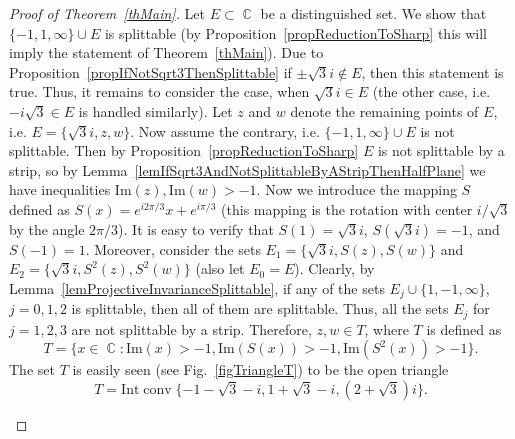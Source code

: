 \documentclass{amsart}
\numberwithin{equation}{section}
\theoremstyle{definition}
\theoremstyle{remark}
\DeclareMathOperator{\conv}{conv}
\DeclareMathOperator{\CC}{\mathbb C}
\begin{document}
	\begin{proof}[Proof of Theorem~\ref{thMain}]
		Let $E \subset \CC$ be a distinguished set. We show that $\{-1,1,\infty\} \cup E$ is splittable (by Proposition~\ref{propReductionToSharp} this will imply the statement of Theorem~\ref{thMain}). Due to Proposition~\ref{propIfNotSqrt3ThenSplittable} if $\pm \sqrt{3}i \notin E$, then this statement is true. Thus, it remains to consider the case, when $\sqrt{3}i \in E$ (the other case, i.e. $-i\sqrt{3} \in E$ is handled similarly). Let $z$ and $w$ denote the remaining points of $E$, i.e. $E = \{\sqrt{3}i, z, w\}$. Now assume the contrary, i.e. $\{-1, 1, \infty\} \cup E$ is not splittable. Then by Proposition~\ref{propReductionToSharp} $E$ is not splittable by a strip, so by Lemma~\ref{lemIfSqrt3AndNotSplittableByAStripThenHalfPlane} we have inequalities $\mathrm{Im}(z), \mathrm{Im}(w) > -1$. Now we introduce the mapping $S$ defined as $S(x) = e^{i2\pi/3}x + e^{i\pi/3}$ (this mapping is the rotation with center $i/\sqrt{3}$ by the angle $2\pi/3$). It is easy to verify that $S(1) = \sqrt{3}i$, $S(\sqrt{3}i) = -1$, and $S(-1) = 1$. Moreover, consider the sets $E_1 = \{\sqrt{3}i, S(z), S(w)\}$ and  $E_2 = \{\sqrt{3}i, S^2(z), S^2(w)\}$ (also let $E_0 = E$). Clearly, by Lemma~\ref{lemProjectiveInvarianceSplittable}, if any of the sets $E_j \cup \{1, -1, \infty\}$, $j = 0,1,2$ is splittable, then all of them are splittable. Thus, all the sets $E_j$ for $j =1,2,3$ are not splittable by a strip. Therefore, $z,w \in T$, where $T$ is defined as
		\[
		T = \{x \in \CC: \mathrm{Im}(x) > -1, \mathrm{Im}(S(x)) > -1, \mathrm{Im}(S^2(x)) > -1\}.
		\]
		The set $T$ is easily seen (see Fig.~\ref{figTriangleT}) to be the open triangle
		\[
		T = \mathrm{Int} \conv\{-1 - \sqrt{3} - i, 1 + \sqrt{3} - i, (2 + \sqrt{3})i\}.
		\]
		\begin{figure}
\end{figure}
\end{proof}
\end{document}
